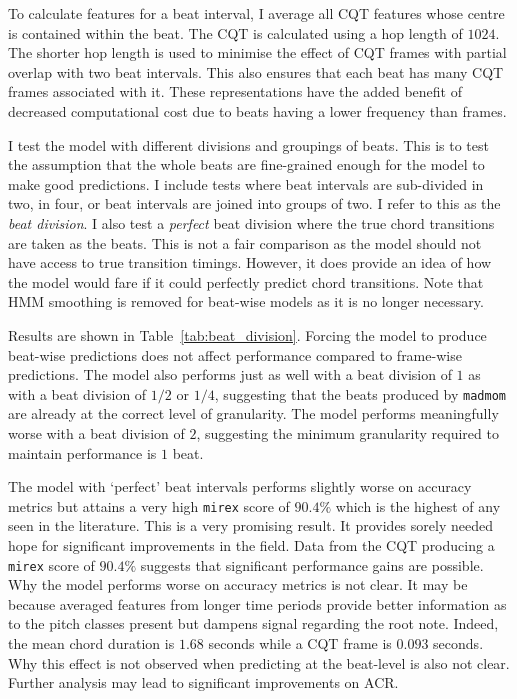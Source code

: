 To calculate features for a beat interval, I average all CQT features whose centre is contained within the beat. The CQT is calculated using a hop length of $1024$. The shorter hop length is used to minimise the effect of CQT frames with partial overlap with two beat intervals. This also ensures that each beat has many CQT frames associated with it. These representations have the added benefit of decreased computational cost due to beats having a lower frequency than frames.


I test the model with different divisions and groupings of beats. This is to test the assumption that the whole beats are fine-grained enough for the model to make good predictions. I include tests where beat intervals are sub-divided in two, in four, or beat intervals are joined into groups of two. I refer to this as the \emph{beat division}. I also test a \emph{perfect} beat division where the true chord transitions are taken as the beats. This is not a fair comparison as the model should not have access to true transition timings. However, it does provide an idea of how the model would fare if it could perfectly predict chord transitions. Note that HMM smoothing is removed for beat-wise models as it is no longer necessary.

Results are shown in Table~\ref{tab:beat_division}. Forcing the model to produce beat-wise predictions does not affect performance compared to frame-wise predictions. The model also performs just as well with a beat division of $1$ as with a beat division of $1/2$ or $1/4$, suggesting that the beats produced by \texttt{madmom} are already at the correct level of granularity. The model performs meaningfully worse with a beat division of $2$, suggesting the minimum granularity required to maintain performance is $1$ beat.

The model with `perfect' beat intervals performs slightly worse on accuracy metrics but attains a very high \texttt{mirex} score of $90.4\%$ which is the highest of any seen in the literature. This is a very promising result. It provides sorely needed hope for significant improvements in the field. Data from the CQT producing a \texttt{mirex} score of $90.4\%$ suggests that significant performance gains are possible. Why the model performs worse on accuracy metrics is not clear. It may be because averaged features from longer time periods provide better information as to the pitch classes present but dampens signal regarding the root note. Indeed, the mean chord duration is $1.68$ seconds while a CQT frame is $0.093$ seconds. Why this effect is not observed when predicting at the beat-level is also not clear. Further analysis may lead to significant improvements on ACR.

